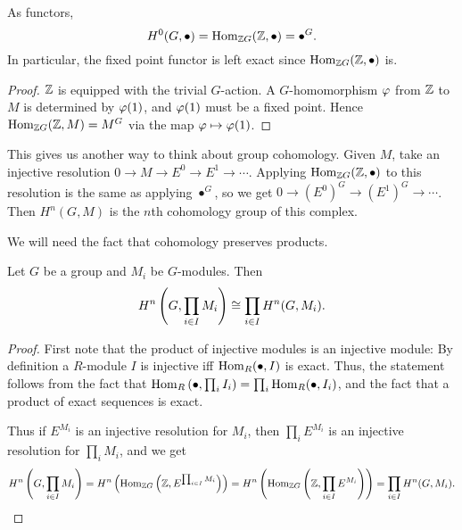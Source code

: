 \begin{pr}
As functors,
\[
H^0(G, \bullet)=\operatorname{Hom}_{\mathbb{Z} G}(\mathbb{Z},\bullet)= \bullet^G.
\]
In particular, the fixed point functor is left exact since $\operatorname{Hom}_{\mathbb{Z} G}(\mathbb{Z}, \bullet)$ is.
\end{pr}
\begin{proof}
$\mathbb{Z}$ is equipped with the trivial $G$-action. A $G$-homomorphism $\varphi$ from $\mathbb{Z}$ to $M$ is determined by $\varphi(1)$, and $\varphi(1)$ must be a fixed point. Hence $\operatorname{Hom}_{\mathbb{Z} G}(\mathbb{Z},M)= M^G$ via the map $\varphi\mapsto \varphi(1)$.
\end{proof}
\begin{rem}
This gives us another way to think about group cohomology. Given $M$, take an injective resolution $0\to M\to E^0\to E^1\to \cdots$. Applying $\operatorname{Hom}_{\mathbb{Z} G}(\mathbb{Z},\bullet)$ to this resolution is the same as applying $\bullet^G$, so we get $0\to (E^0)^G\to (E^1)^G\to \cdots$. Then $H^n(G,M)$ is the $n$th cohomology group of this complex.
\end{rem}
We will need the fact that cohomology preserves products.
\begin{pr}
Let $G$ be a group and $M_i$ be $G$-modules. Then
\[
H^n\left( {G,\prod_{i\in I}M_i} \right)\cong \prod_{i\in I} H^n(G,M_i).
\]
\end{pr}
\begin{proof}
First note that the product of injective modules is an injective module: By definition a $R$-module $I$ is injective iff $\operatorname{Hom}_{R}(\bullet, I)$ is exact. Thus, the statement follows from the fact that $\operatorname{Hom}_R\left( {\bullet,\prod_i I_i} \right)=\prod_i \operatorname{Hom}_R(\bullet,I_i)$, and the fact that a product of exact sequences is exact.

Thus if $E^{M_i}$ is an injective resolution for $M_i$, then $\prod_i E^{M_i}$ is an injective resolution for $\prod_i M_i$, and we get
\[
H^n\left( {G,\prod_{i\in I}M_i} \right)=H^n\left( {\operatorname{Hom}_{\mathbb{Z} G}\left( {\mathbb{Z}, E^{\prod_{i\in I} M_i}} \right)} \right)=H^n\left( {\operatorname{Hom}_{\mathbb{Z} G}\left( {\mathbb{Z}, \prod_{i\in I} E^{M_i}} \right)} \right)=\prod_{i\in I} H^n(G,M_i).
\]
\end{proof}
